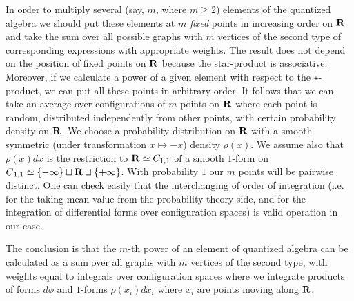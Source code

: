                    In order to multiply several (say, $m$, where $m\ge 2$)
                    elements of the quantized algebra we should put these
                     elements at $m$ {\it fixed} points in increasing order
                     on ${\bf R}$ and take the sum
                      over all possible graphs with $m$ vertices of the
                       second type of corresponding expressions with 
                       appropriate 
                       weights. The result does not depend on the position
                        of fixed points on ${\bf R}$ because the star-product
                        is associative. Moreover, if we calculate a power
                         of a given element with respect to the 
                         $\star$-product,
                     we can put all these points in arbitrary order.
                     It follows that we can take an average over 
                     configurations
                      of $m$ points on ${\bf R}$ where each point is random, 
                      distributed independently from other points, with 
                      certain
                      probability density on ${\bf R}$. We choose a probability 
                      distribution on ${\bf R}$ with a smooth symmetric (under
                       transformation $x\mapsto -x$) density $\rho(x)$.
                        We assume also that $\rho(x)dx$ is the restriction
                         to ${\bf R}\simeq C_{1,1}$ of a smooth $1$-form on
                         ${\overline C}_{1,1}\simeq \{-\infty\}\sqcup {\bf R}\sqcup 
                         \{+\infty\}$.
                       With probability $1$ our $m$ points will be 
                       pairwise
                       distinct. One can check easily that the 
                       interchanging
                      of order of integration (i.e. for the taking 
                      mean value 
                      from the probability theory side, and for the 
                      integration
                       of differential forms over configuration
                        spaces) is valid operation in our case.
                    
                    The conclusion is that the $m$-th  power of an element 
                    of quantized algebra can be 
                    calculated as a sum over all graphs with $m$ vertices of 
                    the second type, with weights equal to integrals
                     over configuration spaces where we integrate 
                     products of forms $d\phi$ and $1$-forms $\rho(x_i)dx_i$
                      where $x_i$ are points moving along ${\bf R}$.
                           
